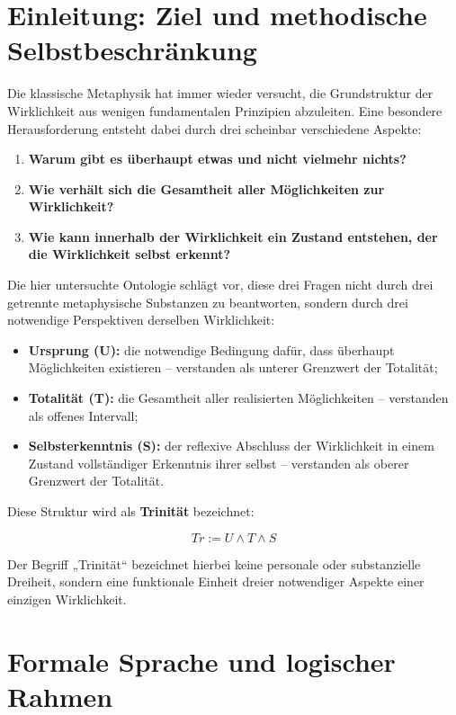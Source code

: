 \documentclass[
]{article}
\begin{document}
\section{Einleitung: Ziel und methodische Selbstbeschränkung}\label{einleitung-ziel-und-methodische-selbstbeschrxe4nkung}

Die klassische Metaphysik hat immer wieder versucht, die Grundstruktur der Wirklichkeit aus wenigen fundamentalen Prinzipien abzuleiten. Eine besondere Herausforderung entsteht dabei durch drei scheinbar verschiedene Aspekte:

\begin{enumerate}
\item \textbf{Warum gibt es überhaupt etwas und nicht vielmehr nichts?}
\item \textbf{Wie verhält sich die Gesamtheit aller Möglichkeiten zur Wirklichkeit?}
\item \textbf{Wie kann innerhalb der Wirklichkeit ein Zustand entstehen, der die Wirklichkeit selbst erkennt?}
\end{enumerate}

Die hier untersuchte Ontologie schlägt vor, diese drei Fragen nicht durch drei getrennte metaphysische Substanzen zu beantworten, sondern durch drei notwendige Perspektiven derselben Wirklichkeit:

\begin{itemize}
\item \textbf{Ursprung (U):} die notwendige Bedingung dafür, dass überhaupt Möglichkeiten existieren – verstanden als unterer Grenzwert der Totalität;
\item \textbf{Totalität (T):} die Gesamtheit aller realisierten Möglichkeiten – verstanden als offenes Intervall;
\item \textbf{Selbsterkenntnis (S):} der reflexive Abschluss der Wirklichkeit in einem Zustand vollständiger Erkenntnis ihrer selbst – verstanden als oberer Grenzwert der Totalität.
\end{itemize}

Diese Struktur wird als \textbf{Trinität} bezeichnet:

\[
Tr := U \land T \land S
\]

Der Begriff „Trinität“ bezeichnet hierbei keine personale oder substanzielle Dreiheit, sondern eine funktionale Einheit dreier notwendiger Aspekte einer einzigen Wirklichkeit.

\section{Formale Sprache und logischer Rahmen}\label{formale-sprache-und-logischer-rahmen}
\end{document}
